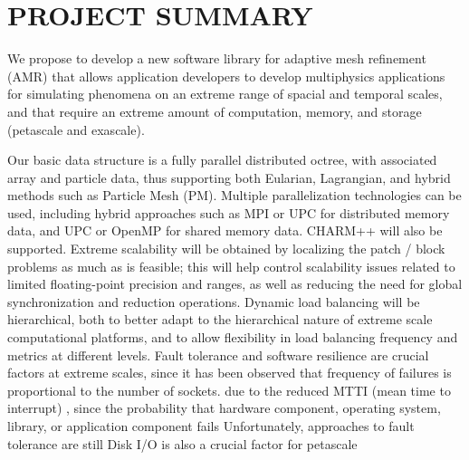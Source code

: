 \documentclass[14pt,letter]{article}
\begin{document}

\nocite{StSh09} %
\nocite{WiHy03} %
\nocite{GuWi06} %
\nocite{BuGh08} %
\nocite{BaBu09} %



\section{PROJECT SUMMARY}  \label{s:summary}

We propose to develop a new software library for adaptive mesh
refinement (AMR) that allows application developers to develop
multiphysics applications for simulating phenomena on an extreme range
of spacial and temporal scales, and that require an extreme amount of
computation, memory, and storage (petascale and exascale).
%

%
Our basic data structure is a fully parallel distributed octree, with
associated array and particle data, thus supporting both Eularian, Lagrangian,
and hybrid methods such as Particle Mesh (PM).
%
Multiple parallelization technologies can be used, including hybrid
approaches such as MPI or UPC for distributed memory data, and UPC or
OpenMP for shared memory data.  CHARM++ will also be supported.
Extreme scalability will be obtained by localizing the patch / block
problems as much as is feasible; this will help control scalability
issues related to limited floating-point precision and ranges, as well
as reducing the need for global synchronization and reduction
operations.
%
Dynamic load balancing will be hierarchical, both to better adapt to
the hierarchical nature of extreme scale computational platforms, and
to allow flexibility in load balancing frequency and metrics at different
levels.
%
Fault tolerance and software resilience are crucial factors at extreme scales,
since it has been observed that frequency of failures is proportional to
the number of sockets.
due to the reduced MTTI (mean time to interrupt) , since the probability that hardware component, operating system, library, or application component fails Unfortunately, approaches to fault tolerance are still 
%
Disk I/O is also a crucial factor for petascale 
\end{document}
